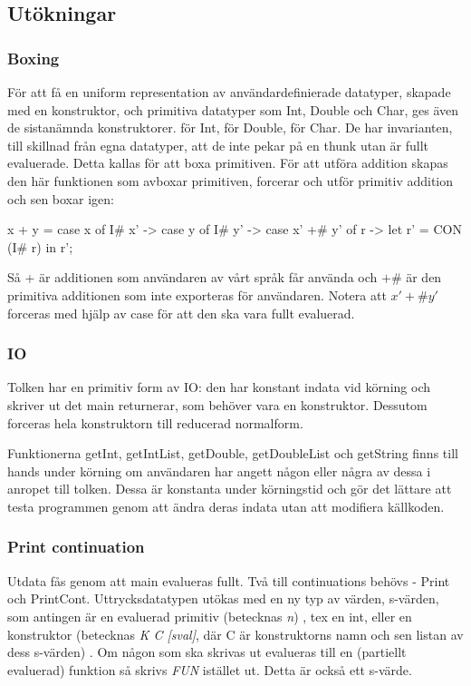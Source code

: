 \documentclass[../Core]{subfiles}
\begin{document}
\subsection{Utökningar}

\subsubsection{Boxing}

För att få en uniform representation av användardefinierade datatyper, skapade
med en konstruktor, och primitiva datatyper som Int, Double och Char, ges även 
de sistanämnda konstruktorer.  för Int,  för Double, 
 för Char. De har invarianten, till skillnad från egna datatyper, 
att de inte pekar på en thunk utan är fullt evaluerade. 
Detta kallas för att boxa primitiven.
    För att utföra addition skapas den här funktionen som avboxar primitiven,
forcerar och utför primitiv addition och sen boxar igen:

\begin{codeEx}
x + y = case x of 
    { I# x' -> case y of
        { I# y' -> case x' +# y' of
            { r -> let r' = CON (I# r) in  r'}}};
\end{codeEx}

Så + är additionen som användaren av vårt språk får använda och $ +\# $ är den
primitiva additionen som inte exporteras för användaren. Notera att $ x' +\# y' $
forceras med hjälp av case för att den ska vara fullt evaluerad.

\subsubsection{IO}
Tolken har en primitiv form av IO: den har konstant indata vid körning och
skriver ut det main returnerar, som behöver vara en konstruktor. Dessutom
forceras hela konstruktorn till reducerad normalform.

Funktionerna getInt, getIntList, getDouble, getDoubleList och getString finns
till hands under körning om användaren har angett någon eller några av dessa
i anropet till tolken. Dessa är konstanta under körningstid och gör det
lättare att testa programmen genom att ändra deras indata utan att modifiera
källkoden.

\subsubsection{Print continuation}
Utdata fås genom att main evalueras fullt. Två till continuations behövs - 
Print och PrintCont. Uttrycksdatatypen utökas med en ny typ av värden, 
s-värden, som antingen är en evaluerad primitiv (betecknas \emph{n})
, tex en int, eller en konstruktor (betecknas \emph{K C [sval]}, där
C är konstruktorns namn och sen listan av dess s-värden) .
Om någon som ska skrivas ut evalueras till en (partiellt evaluerad)
funktion så skrivs \emph{FUN} istället ut. Detta är också ett s-värde.
\end{document}

